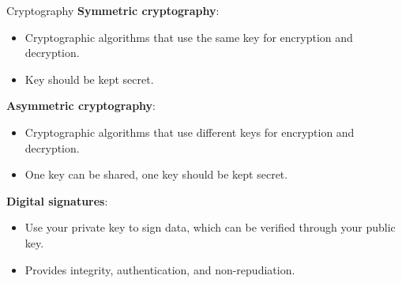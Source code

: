 \documentclass{beamer}
\begin{document}
\begin{frame}{Cryptography}
	\textbf{Symmetric cryptography}:
	\begin{itemize}
		\item Cryptographic algorithms that use the same key for
		encryption and decryption.

		\item Key should be kept secret.
	\end{itemize}

	\textbf{Asymmetric cryptography}:
	\begin{itemize}
		\item Cryptographic algorithms that use different keys for
		encryption and decryption.

		\item One key can be shared, one key should be kept secret.
	\end{itemize}

	\textbf{Digital signatures}:
	\begin{itemize}
		\item Use your private key to sign data, which can be verified
		through your public key.

		\item Provides integrity, authentication, and non-repudiation.
	\end{itemize}
\end{frame}
\end{document}
